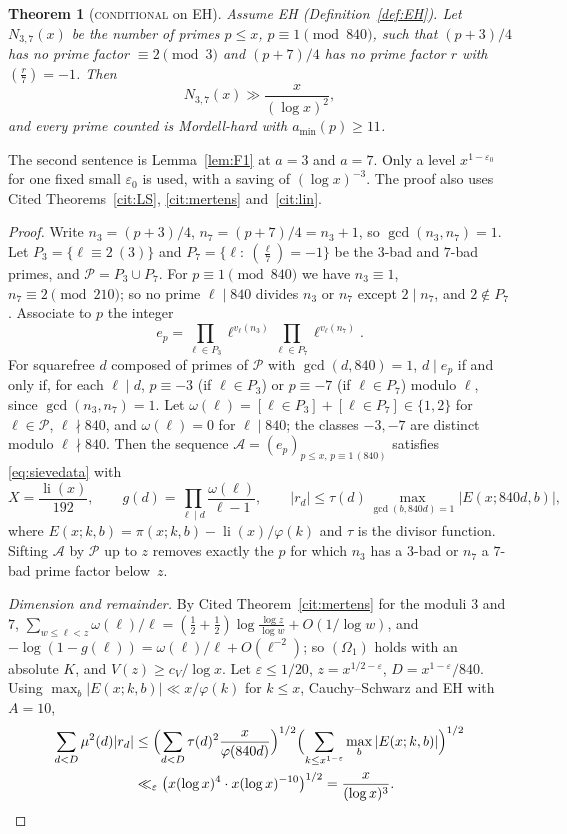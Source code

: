 \documentclass[11pt,reqno]{amsart}
\newtheorem{theorem}{Theorem}[section]
\theoremstyle{definition}
\newcommand{\li}{\operatorname{li}}
\newcommand{\amin}{a_{\min}}
\newcommand{\leg}[2]{\left(\frac{#1}{#2}\right)}
\newcommand{\status}[1]{\textup{\textsc{#1}}}
\begin{document}
\begin{theorem}[\status{conditional} on EH]\label{thm:W2}
Assume EH (Definition~\ref{def:EH}).  Let $N_{3,7}(x)$ be the number of
primes $p\le x$, $p\equiv1\pmod{840}$, such that $(p+3)/4$ has no prime
factor $\equiv2\pmod3$ and $(p+7)/4$ has no prime factor $r$ with
$\leg r7=-1$.  Then
\[
 N_{3,7}(x)\gg\frac x{(\log x)^2},
\]
and every prime counted is Mordell-hard with $\amin(p)\ge11$.
\end{theorem}

The second sentence is Lemma~\ref{lem:F1} at $a=3$ and $a=7$.  Only a level
$x^{1-\varepsilon_0}$ for one fixed small $\varepsilon_0$ is used, with a
saving of $(\log x)^{-3}$.  The proof also uses Cited Theorems~\ref{cit:LS},
\ref{cit:mertens} and~\ref{cit:lin}.

\begin{proof}
Write $n_3=(p+3)/4$, $n_7=(p+7)/4=n_3+1$, so $\gcd(n_3,n_7)=1$.  Let
$P_3=\{\ell\equiv2\ (3)\}$ and $P_7=\{\ell:\ \leg\ell7=-1\}$ be the $3$-bad
and $7$-bad primes, and $\mathcal P=P_3\cup P_7$.  For $p\equiv1\pmod{840}$
we have $n_3\equiv1$, $n_7\equiv2\pmod{210}$; so no prime $\ell\mid840$
divides $n_3$ or $n_7$ except $2\mid n_7$, and $2\notin P_7$.  Associate to
$p$ the integer
\[
 e_p=\prod_{\ell\in P_3}\ell^{v_\ell(n_3)}\prod_{\ell\in P_7}\ell^{v_\ell(n_7)} .
\]
For squarefree $d$ composed of primes of $\mathcal P$ with $\gcd(d,840)=1$,
$d\mid e_p$ if and only if, for each $\ell\mid d$, $p\equiv-3$ (if
$\ell\in P_3$) or $p\equiv-7$ (if $\ell\in P_7$) modulo $\ell$, since
$\gcd(n_3,n_7)=1$.  Let $\omega(\ell)=[\ell\in P_3]+[\ell\in P_7]\in\{1,2\}$
for $\ell\in\mathcal P$, $\ell\nmid840$, and $\omega(\ell)=0$ for
$\ell\mid840$; the classes $-3,-7$ are distinct modulo $\ell\nmid840$.
Then the sequence $\mathcal A=(e_p)_{p\le x,\,p\equiv1\,(840)}$ satisfies
\eqref{eq:sievedata} with
\[
 X=\frac{\li(x)}{192},\qquad g(d)=\prod_{\ell\mid d}\frac{\omega(\ell)}{\ell-1},\qquad
 |r_d|\le\tau(d)\max_{\gcd(b,840d)=1}|E(x;840d,b)|,
\]
where $E(x;k,b)=\pi(x;k,b)-\li(x)/\varphi(k)$ and $\tau$ is the divisor
function.  Sifting $\mathcal A$ by $\mathcal P$ up to $z$ removes exactly
the $p$ for which $n_3$ has a $3$-bad or $n_7$ a $7$-bad prime factor
below~$z$.

\emph{Dimension and remainder.}  By Cited Theorem~\ref{cit:mertens} for
the moduli $3$ and $7$,
$\sum_{w\le\ell<z}\omega(\ell)/\ell=(\tfrac12+\tfrac12)\log\frac{\log z}{\log w}+O(1/\log w)$,
and $-\log(1-g(\ell))=\omega(\ell)/\ell+O(\ell^{-2})$; so $(\Omega_1)$ holds with
an absolute $K$, and $V(z)\ge c_V/\log x$.  Let $\varepsilon\le1/20$,
$z=x^{1/2-\varepsilon}$, $D=x^{1-\varepsilon}/840$.  Using
$\max_b|E(x;k,b)|\ll x/\varphi(k)$ for $k\le x$, Cauchy--Schwarz and EH
with $A=10$,
\begin{align*}
 \sum_{d<D}\mu^2(d)|r_d|
 &\le\Bigl(\sum_{d<D}\tau(d)^2\frac{x}{\varphi(840d)}\Bigr)^{1/2}
 \Bigl(\sum_{k\le x^{1-\varepsilon}}\max_b|E(x;k,b)|\Bigr)^{1/2}\\
 &\ll_\varepsilon\bigl(x(\log x)^4\cdot x(\log x)^{-10}\bigr)^{1/2}=\frac x{(\log x)^3}.
\end{align*}


\end{proof}
\end{document}
